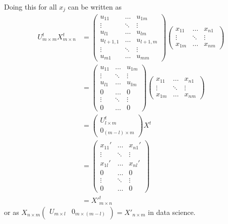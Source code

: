 \documentclass[12pt]{amsart}
\theoremstyle{definition}
\begin{document}
Doing this for all $x_j$ can be written as
\begin{align*}
U^t_{m \times m} X^t_{m \times n} & = \left( \begin{array}{ccc} u_{11} & \dots & u_{1m} \\ \vdots & \ddots & \vdots \\ u_{l1} & \dots & u_{lm} \\ u_{l+1, 1} & \dots & u_{l+1, m} \\ \vdots & \ddots & \vdots \\ u_{m1} & \dots & u_{mm} \end{array} \right)
\left( \begin{array}{ccc} x_{11} & \dots & x_{n1} \\ \vdots & \ddots & \vdots \\ x_{1m} & \dots & x_{nm} \end{array} \right) \\
 & = \left( \begin{array}{ccc} u_{11} & \dots & u_{1m} \\ \vdots & \ddots & \vdots \\ u_{l1} & \dots & u_{lm} \\ 0 & \dots & 0 \\ \vdots & \ddots & \vdots \\ 0 & \dots & 0 \end{array} \right)
\left( \begin{array}{ccc} x_{11} & \dots & x_{n1} \\ \vdots & \ddots & \vdots \\ x_{1m} & \dots & x_{nm} \end{array} \right) \\
& = \left( \begin{array}{c} U^t_{l \times m} \\ 0_{(m-l) \times m} \end{array} \right) X^t \\
& = \left( \begin{array}{ccc} x_{11}' & \dots & x_{n1}' \\ \vdots & \ddots & \vdots \\ x_{1l}' & \dots & x_{nl}' \\ 0 & \dots & 0 \\ \vdots & \ddots & \vdots \\ 0 & \dots & 0 \end{array} \right) \\
 & = X'^t_{m \times n}
\end{align*}
or as $X_{n \times m} \left( \begin{array}{cc} U_{m \times l} & 0_{m \times (m-l)} \end{array} \right) = X'_{n \times m}$ in data science.
\end{document}
